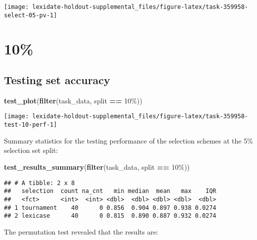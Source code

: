 \documentclass[
]{book}
\newenvironment{Shaded}{\begin{snugshade}}{\end{snugshade}}
\newcommand{\FunctionTok}[1]{\textcolor[rgb]{0.13,0.29,0.53}{\textbf{#1}}}
\newcommand{\NormalTok}[1]{#1}
\newcommand{\SpecialCharTok}[1]{\textcolor[rgb]{0.81,0.36,0.00}{\textbf{#1}}}
\newcommand{\StringTok}[1]{\textcolor[rgb]{0.31,0.60,0.02}{#1}}
\begin{document}
\texttt{[image: lexidate-holdout-supplemental\_files/figure-latex/task-359958-select-05-pv-1]}

\hypertarget{section-31}{%
\section{10\%}\label{section-31}}

\hypertarget{testing-set-accuracy-31}{%
\subsection{Testing set accuracy}\label{testing-set-accuracy-31}}

\begin{Shaded}
\begin{Highlighting}[]
\FunctionTok{test\_plot}\NormalTok{(}\FunctionTok{filter}\NormalTok{(task\_data, split }\SpecialCharTok{==} \StringTok{\textquotesingle{}10\%\textquotesingle{}}\NormalTok{))}
\end{Highlighting}
\end{Shaded}

\texttt{[image: lexidate-holdout-supplemental\_files/figure-latex/task-359958-test-10-perf-1]}

Summary statistics for the testing performance of the selection schemes at the 5\% selection set split:

\begin{Shaded}
\begin{Highlighting}[]
\FunctionTok{test\_results\_summary}\NormalTok{(}\FunctionTok{filter}\NormalTok{(task\_data, split }\SpecialCharTok{==} \StringTok{\textquotesingle{}10\%\textquotesingle{}}\NormalTok{))}
\end{Highlighting}
\end{Shaded}

\begin{verbatim}
## # A tibble: 2 x 8
##   selection  count na_cnt   min median  mean   max    IQR
##   <fct>      <int>  <int> <dbl>  <dbl> <dbl> <dbl>  <dbl>
## 1 tournament    40      0 0.856  0.904 0.897 0.938 0.0274
## 2 lexicase      40      0 0.815  0.890 0.887 0.932 0.0274
\end{verbatim}

The permutation test revealed that the results are:
\end{document}
